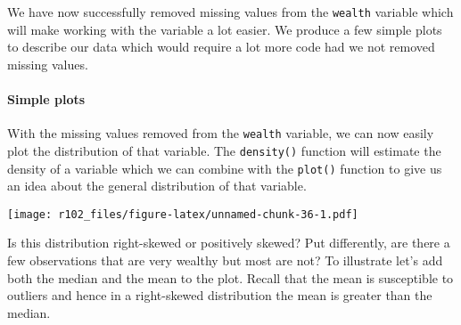 \documentclass[]{article}
\newenvironment{Shaded}{\begin{snugshade}}{\end{snugshade}}
\newcommand{\DataTypeTok}[1]{\textcolor[rgb]{0.13,0.29,0.53}{#1}}
\newcommand{\DecValTok}[1]{\textcolor[rgb]{0.00,0.00,0.81}{#1}}
\newcommand{\FloatTok}[1]{\textcolor[rgb]{0.00,0.00,0.81}{#1}}
\newcommand{\KeywordTok}[1]{\textcolor[rgb]{0.13,0.29,0.53}{\textbf{#1}}}
\newcommand{\NormalTok}[1]{#1}
\newcommand{\OperatorTok}[1]{\textcolor[rgb]{0.81,0.36,0.00}{\textbf{#1}}}
\newcommand{\StringTok}[1]{\textcolor[rgb]{0.31,0.60,0.02}{#1}}
\let\oldparagraph\paragraph
\renewcommand{\paragraph}[1]{\oldparagraph{#1}\mbox{}}
\begin{document}
We have now successfully removed missing values from the \texttt{wealth} variable which will make working with the variable a lot easier. We produce a few simple plots to describe our data which would require a lot more code had we not removed missing values.

\hypertarget{simple-plots}{%
\paragraph{Simple plots}\label{simple-plots}}

With the missing values removed from the \texttt{wealth} variable, we can now easily plot the distribution of that variable. The \texttt{density()} function will estimate the density of a variable which we can combine with the \texttt{plot()} function to give us an idea about the general distribution of that variable.

\begin{Shaded}
\end{Shaded}

\texttt{[image: r102\_files/figure-latex/unnamed-chunk-36-1.pdf]}

Is this distribution right-skewed or positively skewed? Put differently, are there a few observations that are very wealthy but most are not? To illustrate let's add both the median and the mean to the plot. Recall that the mean is susceptible to outliers and hence in a right-skewed distribution the mean is greater than the median.

\begin{Shaded}
\end{Shaded}
\end{document}
